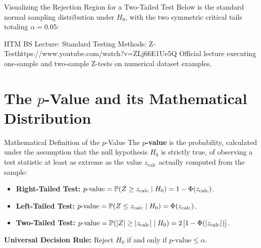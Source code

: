 \begin{intuitionbox}{Visualizing the Rejection Region for a Two-Tailed Test}
Below is the standard normal sampling distribution under $H_0$, with the two symmetric critical tails totaling $\alpha = 0.05$:
\begin{center}
\end{center}
\end{intuitionbox}

\begin{videocard}{IITM BS Lecture: Standard Testing Methods: Z-Test}{https://www.youtube.com/watch?v=ZLj66E1Ue5Q}
Official lecture executing one-sample and two-sample Z-tests on numerical dataset examples.
\end{videocard}

\section{The $p$-Value and its Mathematical Distribution}

\begin{definitionbox}{Mathematical Definition of the $p$-Value}
The \textbf{$p$-value} is the probability, calculated under the assumption that the null hypothesis $H_0$ is strictly true, of observing a test statistic at least as extreme as the value $z_{\text{calc}}$ actually computed from the sample:
\begin{itemize}
    \item \textbf{Right-Tailed Test:} $p\text{-value} = \P(Z \ge z_{\text{calc}} \mid H_0) = 1 - \Phi(z_{\text{calc}})$.
    \item \textbf{Left-Tailed Test:} $p\text{-value} = \P(Z \le z_{\text{calc}} \mid H_0) = \Phi(z_{\text{calc}})$.
    \item \textbf{Two-Tailed Test:} $p\text{-value} = \P(|Z| \ge |z_{\text{calc}}| \mid H_0) = 2 \left[ 1 - \Phi(|z_{\text{calc}}|) \right]$.
\end{itemize}
\textbf{Universal Decision Rule:} Reject $H_0$ if and only if $p\text{-value} \le \alpha$.
\end{definitionbox}

